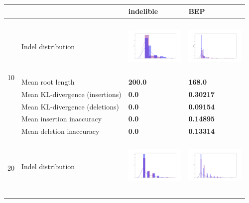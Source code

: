 \documentclass[11pt]{article}
\begin{document}
\begin{table}[]
\begin{tabular}{@{}llll@{}}
\toprule
&  & indelible & BEP \\ \midrule
\multicolumn{1}{|l|}{\multirow{6}{*}{10}} & \multicolumn{1}{l|}{Indel distribution}       & \multicolumn{1}{l|}{\includegraphics[width = 80pt, height = 80pt]{images/indelible_10.png}}& \multicolumn{1}{l|}{\includegraphics[width = 80pt, height = 80pt]{images/BEP_10.png}} \\ \cmidrule(l){2-4}
\multicolumn{1}{|l|}{} & \multicolumn{1}{l|}{Mean root length}& \multicolumn{1}{l|}{\textbf{200.0}}& \multicolumn{1}{l|}{\textbf{168.0}} \\ \cmidrule(l){2-4}
\multicolumn{1}{|l|}{} & \multicolumn{1}{l|}{Mean KL-divergence (insertions)}& \multicolumn{1}{l|}{\textbf{0.0}}& \multicolumn{1}{l|}{\textbf{0.30217}} \\ \cmidrule(l){2-4}
\multicolumn{1}{|l|}{} & \multicolumn{1}{l|}{Mean KL-divergence (deletions)}& \multicolumn{1}{l|}{\textbf{0.0}}& \multicolumn{1}{l|}{\textbf{0.09154}} \\ \cmidrule(l){2-4}
\multicolumn{1}{|l|}{} & \multicolumn{1}{l|}{Mean insertion inaccuracy}& \multicolumn{1}{l|}{\textbf{0.0}}& \multicolumn{1}{l|}{\textbf{0.14895}} \\ \cmidrule(l){2-4}
\multicolumn{1}{|l|}{} & \multicolumn{1}{l|}{Mean deletion inaccuracy}& \multicolumn{1}{l|}{\textbf{0.0}}& \multicolumn{1}{l|}{\textbf{0.13314}} \\ \midrule
\multicolumn{1}{|l|}{\multirow{6}{*}{20}} & \multicolumn{1}{l|}{Indel distribution}       & \multicolumn{1}{l|}{\includegraphics[width = 80pt, height = 80pt]{images/indelible_20.png}}& \multicolumn{1}{l|}{\includegraphics[width = 80pt, height = 80pt]{images/BEP_20.png}} \\ \cmidrule(l){2-4}

\end{tabular}
\end{table}
\end{document}
